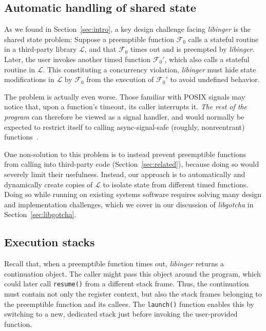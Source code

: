 \subsection{Automatic handling of shared state}

As we found in Section~\ref{sec:intro}, a key design challenge facing
\textit{libinger} is the shared state problem:  Suppose a preemptible function
$\mathcal{F}_0$ calls a stateful routine in a third-party library $\mathcal{L}$, and
that $\mathcal{F}_0$ times out and is preempted by \textit{libinger}.  Later, the
user invokes another timed function $\mathcal{F}_0'$, which also calls a stateful
routine in $\mathcal{L}$.  This constituting a concurrency violation,
\textit{libinger} must hide state modifications in $\mathcal{L}$ by $\mathcal{F}_0$
from the execution of $\mathcal{F}_0'$ to avoid undefined behavior.

The problem is actually even worse.  Those familiar with POSIX signals may notice
that, upon a function's timeout, its caller interrupts it.  \textit{The rest of the
program} can therefore be viewed as a signal handler, and would normally be expected
to restrict itself to calling async-signal-safe (roughly, nonreentrant)
functions~\cite{signal-safety-manpage}.

One non-solution to this problem is to instead prevent preemptible functions from
calling into third-party code (Section~\ref{sec:related}), because doing so would
severely limit their usefulness.  Instead, our approach
is to automatically and dynamically create copies of $\mathcal{L}$ to
isolate state from different timed functions. Doing so while running on
existing systems software requires solving many
design and implementation challenges, which we cover in our discussion of
\textit{libgotcha} in Section~\ref{sec:libgotcha}.



\subsection{Execution stacks}

Recall that, when a preemptible function times out, \textit{libinger} returns a
continuation object.  The caller might pass this object around the program, which
could later call \texttt{resume()} from a different stack frame.  Thus, the
continuation must contain not only the register context, but also the stack
frames belonging to the preemptible function and its callees.  The \texttt{launch()}
function enables this by switching to a new, dedicated stack just before invoking the
user-provided function.

